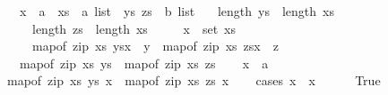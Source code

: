 \begin{isabellebody}
\ \ \ x\ {\isacharcolon}{\kern0pt}{\isacharcolon}{\kern0pt}\ {\isacharprime}{\kern0pt}a\ \ xs\ {\isacharcolon}{\kern0pt}{\isacharcolon}{\kern0pt}\ {\isachardoublequoteopen}{\isacharprime}{\kern0pt}a\ list{\isachardoublequoteclose}\ \ ys\ zs\ {\isacharcolon}{\kern0pt}{\isacharcolon}{\kern0pt}\ {\isachardoublequoteopen}{\isacharprime}{\kern0pt}b\ list{\isachardoublequoteclose}\isanewline
\ \ \ {\isachardoublequoteopen}length\ ys\ {\isacharequal}{\kern0pt}\ length\ xs{\isachardoublequoteclose}\isanewline
\ \ \ \ \ {\isachardoublequoteopen}length\ zs\ {\isacharequal}{\kern0pt}\ length\ xs{\isachardoublequoteclose}\isanewline
\ \ \ \ \ {\isachardoublequoteopen}x\ {\isasymnotin}\ set\ xs{\isachardoublequoteclose}\isanewline
\ \ \ \ \ {\isachardoublequoteopen}map{\isacharunderscore}{\kern0pt}of\ {\isacharparenleft}{\kern0pt}zip\ xs\ ys{\isacharparenright}{\kern0pt}{\isacharparenleft}{\kern0pt}x\ {\isasymmapsto}\ y{\isacharparenright}{\kern0pt}\ {\isacharequal}{\kern0pt}\ map{\isacharunderscore}{\kern0pt}of\ {\isacharparenleft}{\kern0pt}zip\ xs\ zs{\isacharparenright}{\kern0pt}{\isacharparenleft}{\kern0pt}x\ {\isasymmapsto}\ z{\isacharparenright}{\kern0pt}{\isachardoublequoteclose}\isanewline
\ \ \ {\isachardoublequoteopen}map{\isacharunderscore}{\kern0pt}of\ {\isacharparenleft}{\kern0pt}zip\ xs\ ys{\isacharparenright}{\kern0pt}\ {\isacharequal}{\kern0pt}\ map{\isacharunderscore}{\kern0pt}of\ {\isacharparenleft}{\kern0pt}zip\ xs\ zs{\isacharparenright}{\kern0pt}{\isachardoublequoteclose}\isanewline
%
\isadelimproof
%
\endisadelimproof
%
\isatagproof
{}\isamarkupfalse%
\isanewline
\ \ \isamarkupfalse%
\ x{\isacharprime}{\kern0pt}\ {\isacharcolon}{\kern0pt}{\isacharcolon}{\kern0pt}\ {\isacharprime}{\kern0pt}a\isanewline
\ \ \isamarkupfalse%
\ {\isachardoublequoteopen}map{\isacharunderscore}{\kern0pt}of\ {\isacharparenleft}{\kern0pt}zip\ xs\ ys{\isacharparenright}{\kern0pt}\ x{\isacharprime}{\kern0pt}\ {\isacharequal}{\kern0pt}\ map{\isacharunderscore}{\kern0pt}of\ {\isacharparenleft}{\kern0pt}zip\ xs\ zs{\isacharparenright}{\kern0pt}\ x{\isacharprime}{\kern0pt}{\isachardoublequoteclose}\isanewline
\ \ \isamarkupfalse%
\ {\isacharparenleft}{\kern0pt}cases\ {\isachardoublequoteopen}x\ {\isacharequal}{\kern0pt}\ x{\isacharprime}{\kern0pt}{\isachardoublequoteclose}{\isacharparenright}{\kern0pt}\isanewline
\ \ \ \ \isamarkupfalse%
\ True\isanewline
\ \ \ \ \isamarkupfalse%

\end{isabellebody}
